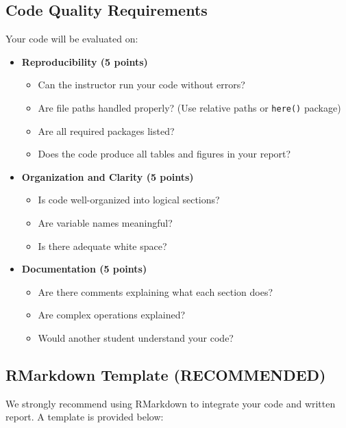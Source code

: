 \documentclass[11pt]{article}
\begin{document}
\subsection{Code Quality Requirements}

Your code will be evaluated on:

\begin{itemize}
\item \textbf{Reproducibility (5 points)}
  \begin{itemize}
  \item Can the instructor run your code without errors?
  \item Are file paths handled properly? (Use relative paths or \texttt{here()} package)
  \item Are all required packages listed?
  \item Does the code produce all tables and figures in your report?
  \end{itemize}

\item \textbf{Organization and Clarity (5 points)}
  \begin{itemize}
  \item Is code well-organized into logical sections?
  \item Are variable names meaningful?
  \item Is there adequate white space?
  \end{itemize}

\item \textbf{Documentation (5 points)}
  \begin{itemize}
  \item Are there comments explaining what each section does?
  \item Are complex operations explained?
  \item Would another student understand your code?
  \end{itemize}
\end{itemize}

\subsection{RMarkdown Template (RECOMMENDED)}

We strongly recommend using RMarkdown to integrate your code and written report. A template is provided below:
\end{document}
